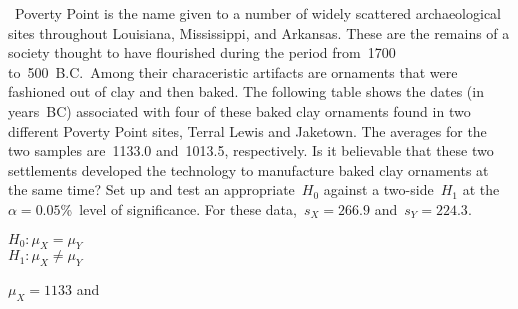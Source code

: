 \begin{problem}
  ~Poverty Point is the name given to a number of widely scattered archaeological sites throughout Louisiana, Mississippi, and Arkansas.  These are the remains of a society thought to have flourished during the period from~1700 to~500~B.C.\ Among their characeristic artifacts are ornaments that were fashioned out of clay and then baked.  The following table shows the dates (in years~BC) associated with four of these baked clay ornaments found in two different Poverty Point sites, Terral Lewis and Jaketown.  The averages for the two samples are~1133.0 and~1013.5, respectively.  Is it believable that these two settlements developed the technology to manufacture baked clay ornaments at the same time?  Set up and test an appropriate~$H_0$ against a two-side~$H_1$ at the ${\alpha = 0.05}$\%~level of significance.  For these data,~${s_{X} = 266.9}$ and~${s_Y = 224.3}$.
\end{problem}

\noindent
${H_0: \mu_{X} = \mu_{Y}}$ \\
${H_1: \mu_{X} \ne \mu_{Y}}$

${\mu_{X} = 1133}$ and
